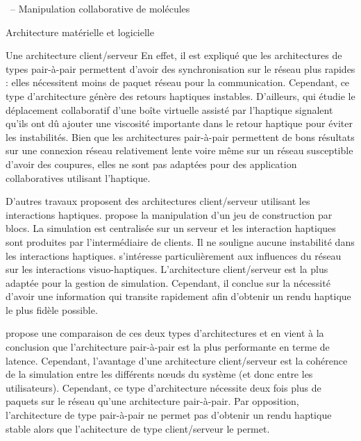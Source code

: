 \documentclass[myfrancais]{mythesis}
\begin{document}
\begin{mychapter}{\myShaddock\ -- Manipulation collaborative de molécules}
\begin{mysection}{Architecture matérielle et logicielle}
\begin{mysubsection}{Une architecture client/serveur}
				En effet, il est expliqué que les architectures de types pair-à-pair permettent d'avoir des synchronisation sur le réseau plus rapides : elles nécessitent moins de paquet réseau pour la communication.
				Cependant, ce type d'architecture génère des retours haptiques instables.
				D'ailleurs,  qui étudie le déplacement collaboratif d'une boîte virtuelle assisté par l'haptique signalent qu'ils ont dû ajouter une viscosité importante dans le retour haptique pour éviter les instabilités.
				Bien que les architectures pair-à-pair permettent de bons résultats sur une connexion réseau relativement lente voire même sur un réseau susceptible d'avoir des coupures, elles ne sont pas adaptées pour des application collaboratives utilisant l'haptique.
				
				D'autres travaux proposent des architectures client/serveur utilisant les interactions haptiques.
				 propose la manipulation d'un jeu de construction par blocs.
				La simulation est centralisée sur un serveur et les interaction haptiques sont produites par l'intermédiaire de clients.
				Il ne souligne aucune instabilité dans les interactions haptiques.
				 s'intéresse particulièrement aux influences du réseau sur les interactions visuo-haptiques.
				L'architecture client/serveur est la plus adaptée pour la gestion de simulation.
				Cependant, il conclue sur la nécessité d'avoir une information qui transite rapidement afin d'obtenir un rendu haptique le plus fidèle possible.

				 propose une comparaison de ces deux types d'architectures et en vient à la conclusion que l'architecture pair-à-pair est la plus performante en terme de latence.
				Cependant, l'avantage d'une architecture client/serveur est la cohérence de la simulation entre les différents nœuds du système (et donc entre les utilisateurs).
				Cependant, ce type d'architecture nécessite deux fois plus de paquets sur le réseau qu'une architecture pair-à-pair.
				Par opposition, l'architecture de type pair-à-pair ne permet pas d'obtenir un rendu haptique stable alors que l'achitecture de type client/serveur le permet.


\end{mysubsection}
\end{mysection}
\end{mychapter}
\end{document}
